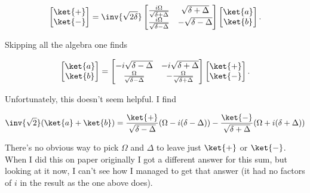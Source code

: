 \begin{equation}\label{eqn:qmIexamPractice2008Dec:2:150}
\begin{bmatrix}
\ket{+} \\
\ket{-} \\
\end{bmatrix}
=\inv{\sqrt{2\delta}}
\begin{bmatrix}
\frac{i \Omega}{\sqrt{\delta + \Delta}} & \sqrt{\delta + \Delta} \\
\frac{i \Omega}{\sqrt{\delta - \Delta}} & -\sqrt{\delta - \Delta}
\end{bmatrix}
\begin{bmatrix}
\ket{a} \\
\ket{b} \\
\end{bmatrix}.
\end{equation}

Skipping all the algebra one finds

\begin{equation}\label{eqn:qmIexamPractice2008Dec:2:160}
\begin{bmatrix}
\ket{a} \\
\ket{b} \\
\end{bmatrix}
=
\begin{bmatrix}
-i\sqrt{\delta - \Delta} & -i\sqrt{\delta + \Delta} \\
\frac{\Omega}{\sqrt{\delta - \Delta}} &
-\frac{\Omega}{\sqrt{\delta + \Delta}} 
\end{bmatrix}
\begin{bmatrix}
\ket{+} \\
\ket{-} \\
\end{bmatrix}.
\end{equation}

Unfortunately, this doesn't seem helpful.  I find

\begin{equation}\label{eqn:qmIexamPractice2008Dec:2:170}
\inv{\sqrt{2}} ( \ket{a} + \ket{b} ) = 
\frac{\ket{+}}{\sqrt{\delta - \Delta}}( \Omega - i (\delta - \Delta) )
-\frac{\ket{-}}{\sqrt{\delta + \Delta}}( \Omega + i (\delta + \Delta) )
\end{equation}

There's no obvious way to pick $\Omega$ and $\Delta$ to leave just $\ket{+}$ or $\ket{-}$.  When I did this on paper originally I got a different answer for this sum, but looking at it now, I can't see how I managed to get that answer (it had no factors of $i$ in the result as the one above does).

\EndNoBibArticle
